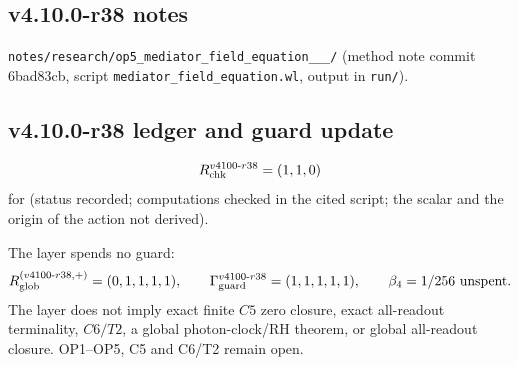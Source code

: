 \subsection*{v4.10.0-r38 notes}
\label{subsec:v4100-r38-notes}

\texttt{notes/\allowbreak research/\allowbreak op5\_\allowbreak mediator\_\allowbreak field\_\allowbreak equation\_\_\_/} (method note commit 6bad83cb,
script \texttt{mediator\_\allowbreak field\_\allowbreak equation.wl}, output in \texttt{run/}).

\subsection*{v4.10.0-r38 ledger and guard update}
\label{subsec:v4100-r38-ledger-guard}

\[
R_{\rm chk}^{v4100\text{-}r38}=(1,1,0)
\]
for (status recorded; computations checked in the cited script; the scalar and the origin of the action not derived).

The layer spends no guard:
\[
R_{\rm glob}^{(v4100\text{-}r38,+)}=(0,1,1,1,1),
\qquad
\Gamma_{\rm guard}^{v4100\text{-}r38}=(1,1,1,1,1),
\qquad
\beta_4=1/256\ \text{unspent}.
\]
The layer does not imply exact finite \(C5\) zero closure, exact all-readout terminality, \(C6/T2\), a global photon-clock/RH theorem,
or global all-readout closure.  OP1--OP5, C5 and C6/T2 remain open.
